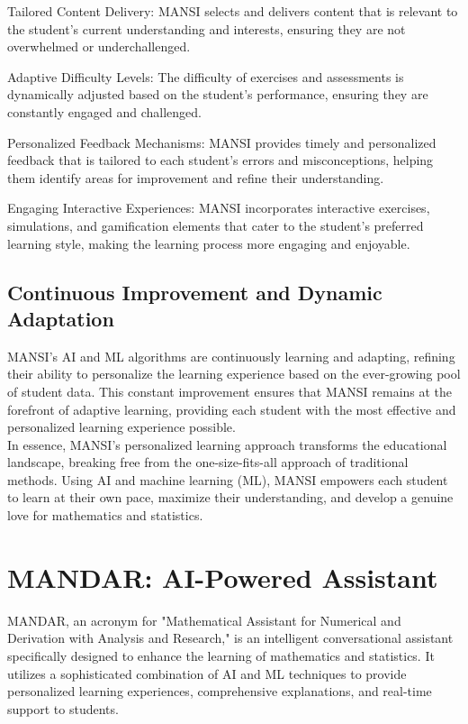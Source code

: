 \documentclass[20pt]{report}
\begin{document}
Tailored Content Delivery: MANSI selects and delivers content that is relevant to the student's current understanding and interests, ensuring they are not overwhelmed or underchallenged.

Adaptive Difficulty Levels: The difficulty of exercises and assessments is dynamically adjusted based on the student's performance, ensuring they are constantly engaged and challenged.

Personalized Feedback Mechanisms: MANSI provides timely and personalized feedback that is tailored to each student's errors and misconceptions, helping them identify areas for improvement and refine their understanding.

Engaging Interactive Experiences: MANSI incorporates interactive exercises, simulations, and gamification elements that cater to the student's preferred learning style, making the learning process more engaging and enjoyable.

\subsection{Continuous Improvement and Dynamic Adaptation}
MANSI's AI and ML algorithms are continuously learning and adapting, refining their ability to personalize the learning experience based on the ever-growing pool of student data. This constant improvement ensures that MANSI remains at the forefront of adaptive learning, providing each student with the most effective and personalized learning experience possible.\\
In essence, MANSI's personalized learning approach transforms the educational landscape, breaking free from the one-size-fits-all approach of traditional methods. Using AI and machine learning (ML), MANSI empowers each student to learn at their own pace, maximize their understanding, and develop a genuine love for mathematics and statistics.
\section{MANDAR: AI-Powered Assistant}

MANDAR, an acronym for "Mathematical Assistant for Numerical and Derivation with Analysis and Research," is an intelligent conversational assistant specifically designed to enhance the learning of mathematics and statistics. It utilizes a sophisticated combination of AI and ML techniques to provide personalized learning experiences, comprehensive explanations, and real-time support to students.
\end{document}
